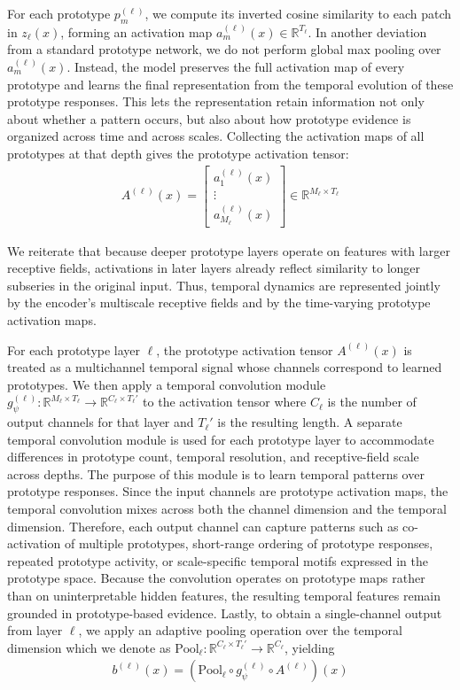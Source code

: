 \documentclass{article}
\newcommand{\R}{\mathbb R}
\begin{document}
For each prototype $p_m^{(\ell)}$, we compute its inverted cosine similarity to each patch in $z_\ell(x)$, forming an activation map $a_m^{(\ell)}(x) \in \R^{T_\ell}$. In another deviation from a standard prototype network, we do not perform global max pooling over $a_m^{(\ell)}(x)$. Instead, the model preserves the full activation map of every prototype and learns the final representation from the temporal evolution of these prototype responses. This lets the representation retain information not only about whether a pattern occurs, but also about how prototype evidence is organized across time and across scales. Collecting the activation maps of all prototypes at that depth gives the prototype activation tensor:
\begin{align*}
    A^{(\ell)}(x) = 
    \begin{bmatrix}
        a_1^{(\ell)}(x) \\ \vdots \\ a_{M_\ell}^{(\ell)}(x)
    \end{bmatrix}
    \in \R^{M_\ell \times T_\ell}
\end{align*}

We reiterate that because deeper prototype layers operate on features with larger receptive fields, activations in later layers already reflect similarity to longer subseries in the original input. Thus, temporal dynamics are represented jointly by the encoder's multiscale receptive fields and by the time-varying prototype activation maps.

For each prototype layer $\ell$, the prototype activation tensor $A^{(\ell)}(x)$ is treated as a multichannel temporal signal whose channels correspond to learned prototypes. We then apply a temporal convolution module $g^{(\ell)}_{\psi}: \R^{M_\ell \times T_\ell} \to \R^{C_\ell \times T_\ell'}$ to the activation tensor where $C_\ell$ is the number of output channels for that layer and $T_\ell'$ is the resulting length. A separate temporal convolution module is used for each prototype layer to accommodate differences in prototype count, temporal resolution, and receptive-field scale across depths. The purpose of this module is to learn temporal patterns over prototype responses. Since the input channels are prototype activation maps, the temporal convolution mixes across both the channel dimension and the temporal dimension. Therefore, each output channel can capture patterns such as co-activation of multiple prototypes, short-range ordering of prototype responses, repeated prototype activity, or scale-specific temporal motifs expressed in the prototype space. Because the convolution operates on prototype maps rather than on uninterpretable hidden features, the resulting temporal features remain grounded in prototype-based evidence. Lastly, to obtain a single-channel output from layer $\ell$, we apply an adaptive pooling operation over the temporal dimension which we denote as $\text{Pool}_\ell: \R^{C_\ell \times T_\ell'} \to \R^{C_\ell}$, yielding 
\begin{align*}
    b^{(\ell)}(x) = \left(\text{Pool}_\ell \circ g^{(\ell)}_{\psi} \circ A^{(\ell)}\right) (x)
\end{align*}
\end{document}
